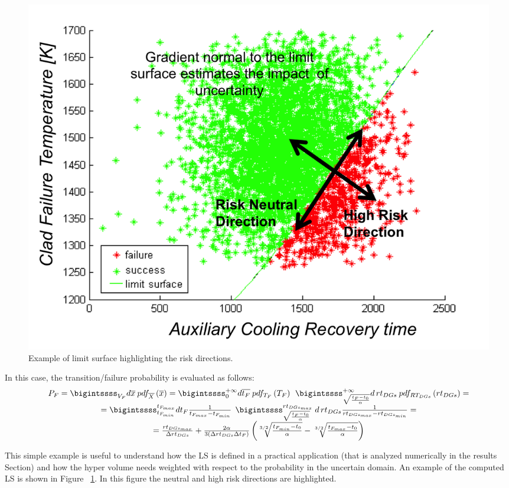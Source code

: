 \begin{figure}[h!]
  \centering
  \includegraphics[width=1.0\textwidth]  {pics/ExampleLSwitRiskDirections.png}
  \caption{Example of limit surface highlighting the risk directions.}
  \label{fig:ExampleLSwitRiskDirections}
\end{figure}
In this case, the transition/failure probability is evaluated as follows:
\begin{equation}
\begin{matrix} 
P_{F} = \bigintssss_{V_{F}}d\overline{x}\: pdf_{\overline{X}}\left ( \overline{x} \right ) 
= \bigintssss_{0}^{+\infty }d\overline{t_{F}}\: pdf_{T_{F}}\left ( T_{F} \right )\: \: \bigintssss_{\sqrt{\frac{t_{F}-t_{0}}{\alpha}}}^{+\infty } d\, rt_{DGs} \: pdf_{RT_{DGs}}\left ( rt_{DGs} \right )  =
\\
= \bigintssss_{t_{F_{min}}}^{t_{F_{max}}} dt_{F}\frac{1}{t_{F_{max}}-t_{F_{min}}}\: \: \bigintssss_{\sqrt{\frac{t_{F}-t_{0}}{\alpha}}}^{ rt_{DGs_{max}}}\: d\, rt_{DGs} \frac{1}{rt_{DGs_{max}}-rt_{DGs_{min}}} =
\\
= \frac{rt_{DGs_{max}}}{\Delta rt_{DGs}} + \frac{2\alpha}{3\left ( \Delta rt_{DGs}\Delta t_{F} \right )}
\left ( \sqrt[3/2]{\frac{t_{F_{min}}-t_{0}}{\alpha}} - \sqrt[3/2]{\frac{t_{F_{max}}-t_{0}}{\alpha}} \right )
\end{matrix}
\end{equation}

This simple example is useful to understand how the LS is defined in a practical application (that is analyzed numerically in the results Section) and how the hyper volume needs weighted with respect to the probability in the uncertain domain. An example of the computed LS is shown in Figure ~\ref{fig:ExampleLSwitRiskDirections}.
In this figure the neutral and high risk directions are highlighted. 

